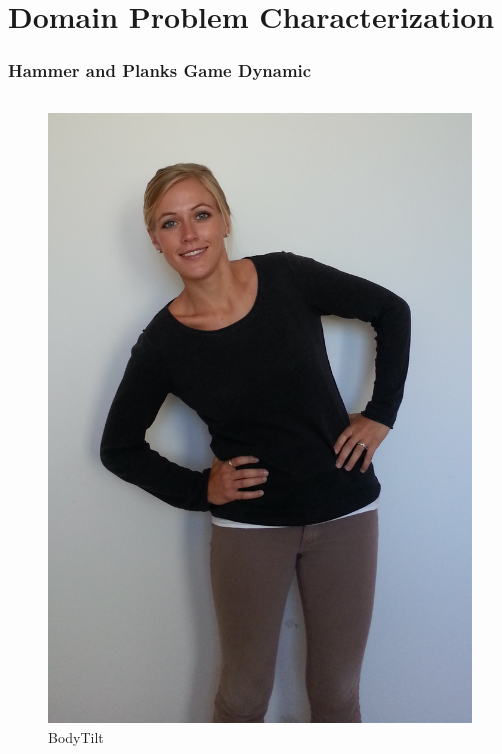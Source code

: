 \documentclass{beamer}
\begin{document}
\section{Domain Problem Characterization}
\begin{frame}
\frametitle{Hammer and Planks Game Dynamic}
\begin{columns}
\centering
\begin{figure}
\includegraphics[scale=0.06]{images/mia_bodytilt.png}
\caption{BodyTilt}
\end{figure}


\end{columns}
\end{frame}
\end{document}
